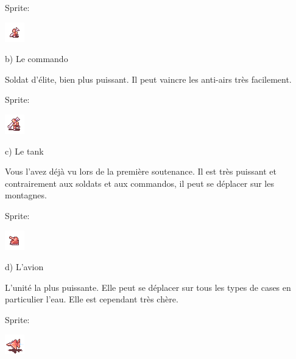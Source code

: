 \documentclass{article}
\begin{document}
\par
Sprite:
\newline

\includegraphics[scale=1]{soldat}

\par
b)                 Le commando
\newline

\par
Soldat d'élite, bien plus puissant. Il peut vaincre les anti-airs très facilement.
\newline

\par
Sprite:
\newline

\includegraphics[scale=1]{commando}

\par
c)                 Le tank
\newline

\par
Vous l'avez déjà vu lors de la première soutenance. Il est très puissant et contrairement aux soldats et aux commandos, il peut se déplacer sur les montagnes.
\newline

\par
Sprite:
\newline

\includegraphics[scale=1]{tank}

\par
d)                 L'avion
\newline

\par
L'unité la plus puissante. Elle peut se déplacer sur tous les types de cases en particulier l'eau. Elle est cependant très chère.
\newline

\par
Sprite:
\newline

\includegraphics[scale=1]{avion}
\end{document}
